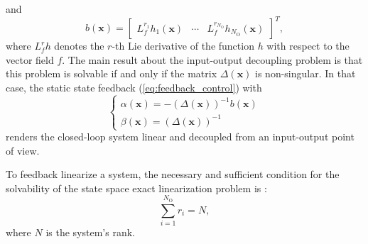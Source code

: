 \documentclass[letterpaper, 10 pt, conference]{ieeeconf}  %
\begin{document}
and
\begin{equation}
b(\mathbf{x}) = \begin{bmatrix}L^{r_1}_f h_1(\mathbf{x}) & \cdots & L^{r_{N_\text{O}}}_f h_{N_\text{O}}(\mathbf{x})\end{bmatrix}^T,
\label{eq:b}
\end{equation}
where $L^r_f h$ denotes the $r$-th Lie derivative of the function $h$ with respect to the vector field $f$.
The main result about the input-output decoupling problem is that this problem is solvable if and only if the matrix $\Delta(\mathbf{x})$ is non-singular. In that case, the static state feedback (\ref{eq:feedback_control}) with
\begin{equation}
\begin{cases}
\alpha(\mathbf{x}) = -\left( \Delta(\mathbf{x}) \right)^{-1} b(\mathbf{x}) \\
\beta(\mathbf{x}) = \left( \Delta(\mathbf{x}) \right)^{-1}
\end{cases}
\label{eq:alpha_beta}
\end{equation}
renders the closed-loop system linear and decoupled from an input-output point of view.

To feedback linearize a system, the necessary and sufficient condition for the solvability of the state space exact linearization problem is \cite{Isidori1986CDC}:
\begin{equation}
\sum_{i = 1}^{N_\text{O}}{r_i} = N,
\label{eq:condition}
\end{equation}
where $N$ is the system's rank.
\end{document}
